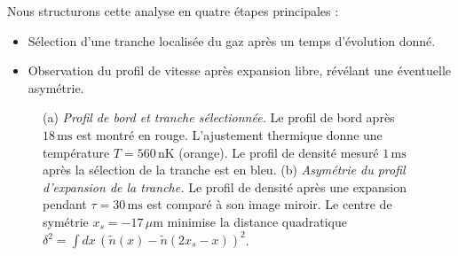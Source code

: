 \medskip

Nous structurons cette analyse en quatre étapes principales :
\begin{itemize}
    \item Sélection d’une tranche localisée du gaz après un temps d’évolution donné.
    \item Observation du profil de vitesse après expansion libre, révélant une éventuelle asymétrie.
\end{itemize}


\begin{figure}[!htb]
\centering
{}
\caption{(a) {\it Profil de bord et tranche sélectionnée.} Le profil de bord après $18\,\mathrm{ms}$ est montré en rouge. L'ajustement thermique donne une température $T = 560\,\mathrm{nK}$ (orange). Le profil de densité mesuré $1\,\mathrm{ms}$ après la sélection de la tranche est en bleu. (b) {\it Asymétrie du profil d’expansion de la tranche.} Le profil de densité après une expansion pendant $\tau = 30\,\mathrm{ms}$ est comparé à son image miroir. Le centre de symétrie $x_s = -17\,\mu$m minimise la distance quadratique $\delta^2 = \int dx\, (\tilde{n}(x) - \tilde{n}(2x_s - x))^2$.}
\label{fig:simul_deformation}
\end{figure}



